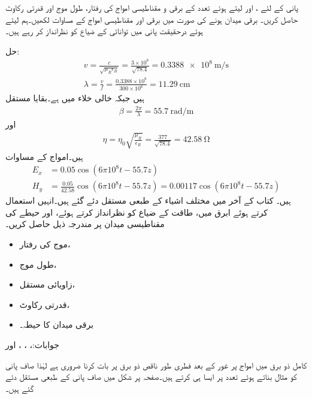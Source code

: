 پانی کے لئے ،  اور  لیتے ہوئے  تعدد کے برقی و مقناطیسی امواج کی رفتار، طول موج اور قدرتی رکاوٹ حاصل کریں۔ برقی میدان  ہونے کی صورت میں برقی اور مقناطیسی امواج کے مساوات لکھیں۔ہم  لیتے ہوئے درحقیقت پانی میں توانائی کے ضیاع کو نظرانداز کر رہے ہیں۔

حل:
\begin{align*}
v=\frac{c}{\sqrt{\mu_R \epsilon_R}}=\frac{3 \times 10^8}{\sqrt{78.4}}=\SI{0.3388e8}{\meter \per \second}\\
\lambda=\frac{v}{f}=\frac{0.3388 \times 10^8}{300 \times 10^6}=\SI{11.29}{\centi\meter}
\end{align*}
ہیں جبکہ خالی خلاء میں  ہے۔بقایا مستقل
\begin{align*}
\beta=\frac{2\pi}{\lambda}=\SI{55.7}{\radian \per \meter}
\end{align*}
اور
\begin{align*}
\eta=\eta_0 \sqrt{\frac{\mu_R}{\epsilon_R}}=\frac{377}{\sqrt{78.4}}=\SI{42.58}{\ohm}
\end{align*}
ہیں۔امواج کے مساوات
\begin{align*}
E_x&=0.05 \cos (6\pi 10^8 t -55.7 z)\\
H_y&=\frac{0.05}{42.58} \cos (6\pi 10^8 t -55.7 z)=0.00117 \cos (6\pi 10^8 t -55.7 z)
\end{align*}
ہیں۔
کتاب کے آخر میں مختلف اشیاء کے طبعی مستقل دئے گئے ہیں۔انہیں استعمال کرتے ہوئے  ابرق میں، طاقت کے ضیاع کو نظرانداز کرتے ہوئے،   اور  حیطے  کی مقناطیسی میدان پر مندرجہ ذیل حاصل کریں۔
\begin{itemize}
\item
موج کی رفتار،
\item
طول موج،
\item
زاویائی مستقل،
\item
قدرتی رکاوٹ،
\item
برقی میدان کا حیطہ۔
\end{itemize} 

جوابات:، ، ،  اور 

کامل ذو برق میں امواج پر غور کے بعد فطری طور ناقص ذو برق پر بات کرنا ضروری ہے لہٰذا صاف پانی کو مثال بناتے ہوئے    تعدد پر  ایسا ہی کرتے ہیں۔صفحہ  پر شکل  میں صاف پانی کے طبعی مستقل دئے گئے ہیں۔

